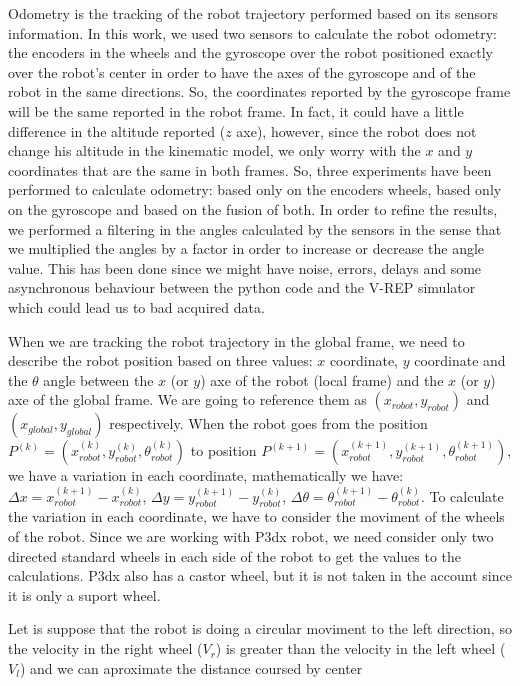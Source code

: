 \documentclass[twoside,conference,a4paper]{IEEEtran}
\begin{document}
Odometry is the tracking of the robot trajectory performed based on its sensors information. In this work, we used two
sensors to calculate the robot odometry: the encoders in the wheels and the gyroscope over the robot positioned exactly
over the robot's center in order to have the axes of the gyroscope and of the robot in the same directions. So, the
coordinates reported by the gyroscope frame will be the same reported in the robot frame. In fact, it could have a 
little difference in the altitude reported ($ z $ axe), however, since the robot does not change his altitude in the
kinematic model, we only worry with the $ x $ and $ y $ coordinates that are the same in both frames. So, three experiments have been performed 
to calculate odometry: based only on the encoders wheels, based only on the gyroscope and based on the fusion of both. 
In order to refine the results, we performed a filtering in the angles calculated by the sensors in the sense that we multiplied the angles 
by a factor in order to increase or decrease the angle value. This
has been done since we might have noise, errors, delays and some asynchronous behaviour between the python code and the V-REP simulator which could lead
us to bad acquired data. \par
When we are tracking the robot trajectory in the global frame, we need to describe the robot position based on three
values: $ x $ coordinate, $ y $ coordinate and the $ \theta $ angle between the $ x $ (or $ y $) axe of the robot (local 
frame) and the $ x $ (or $ y $) axe of the global frame. We are going to reference them as $ (x_{robot}, y_{robot}) $ 
and $ (x_{global}, y_{global}) $ respectively. When the robot goes from the position $ P_{}^{(k)} = (x_{robot}^{(k)}, y_{
robot}^{(k)}, \theta_{robot}^{(k)}) $ to position $ P_{}^{(k+1)} = (x_{robot}^{(k+1)}, y_{robot}^{(k+1)}, \theta_{robot}^
{(k+1)}) $, we have a variation in each coordinate, mathematically we have: $ \Delta x = x_{robot}^{(k+1)} - x_{robot}^{(
k)} $, $ \Delta y = y_{robot}^{(k+1)} - y_{robot}^{(k)} $, $ \Delta \theta = \theta_{robot}^{(k+1)} - \theta_{robot}^{(k)}$. To calculate the variation in each coordinate, we have to consider the moviment of the wheels of the robot. Since we are working with P3dx robot, we need consider only two directed standard wheels in each side of the robot to get the values to the calculations. P3dx also has a castor wheel, but it is not taken in the account since it is only a suport wheel. \par
Let is suppose that the robot is doing a circular moviment to the left direction, so the velocity in the right wheel ($ V_{r} $) is greater than the velocity in the left wheel ($ V_{l} $) and we can aproximate the distance coursed by center 
\end{document}
